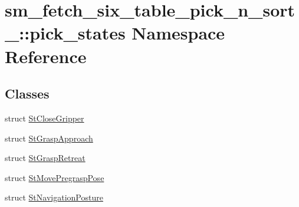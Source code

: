 \hypertarget{namespacesm__fetch__six__table__pick__n__sort__1_1_1pick__states}{}\section{sm\+\_\+fetch\+\_\+six\+\_\+table\+\_\+pick\+\_\+n\+\_\+sort\+\_\+:\+:pick\+\_\+states Namespace Reference}
\label{namespacesm__fetch__six__table__pick__n__sort__1_1_1pick__states}
\subsection*{Classes}
\begin{DoxyCompactItemize}
\item 
struct \hyperlink{structsm__fetch__six__table__pick__n__sort__1_1_1pick__states_1_1StCloseGripper}{St\+Close\+Gripper}
\item 
struct \hyperlink{structsm__fetch__six__table__pick__n__sort__1_1_1pick__states_1_1StGraspApproach}{St\+Grasp\+Approach}
\item 
struct \hyperlink{structsm__fetch__six__table__pick__n__sort__1_1_1pick__states_1_1StGraspRetreat}{St\+Grasp\+Retreat}
\item 
struct \hyperlink{structsm__fetch__six__table__pick__n__sort__1_1_1pick__states_1_1StMovePregraspPose}{St\+Move\+Pregrasp\+Pose}
\item 
struct \hyperlink{structsm__fetch__six__table__pick__n__sort__1_1_1pick__states_1_1StNavigationPosture}{St\+Navigation\+Posture}
\end{DoxyCompactItemize}
